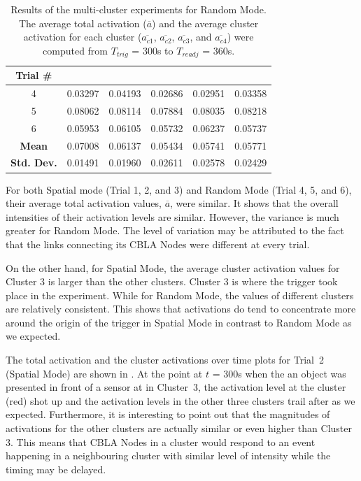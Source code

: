 \begin{table}[!htb]
	\caption[Results of the multi-cluster experiment for Random Mode]{Results of the multi-cluster experiments for Random Mode. The average total activation ($\overline{a}$) and the average cluster activation for each cluster ($\overline{a_{c1}}$, $\overline{a_{c2}}$, $\overline{a_{c3}}$, and $\overline{a_{c4}}$) were computed from $T_{trig}$ = 300s to  $T_{readj}$ = 360s. }
	\begin{center}
		\begin{tabular}{ | c | c | c | c | c | c |} 
			\hline
			\textbf{Trial \#} & \boldmath{$\overline{a}$}  & \boldmath{$\overline{a_{c1}}$}  & \boldmath{$\overline{a_{c2}}$} & \boldmath{$\overline{a_{c3}}$} & \boldmath{$\overline{a_{c4}}$} \\ 
			\hline
			\hline
			4 & 0.03297	& 0.04193 &	0.02686 & 0.02951 & 0.03358 \\
			\hline
			5 &	0.08062 & 0.08114 & 0.07884 & 0.08035 & 0.08218 \\
			\hline
			6 &	0.05953 & 0.06105 &	0.05732 & 0.06237 & 0.05737 \\
			\hlineB{3}	
			\textbf{Mean} & 0.07008	& 0.06137 &	0.05434	& 0.05741 & 0.05771  \\
			\hline
			\textbf{Std. Dev.} & 0.01491 & 0.01960 & 0.02611 & 0.02578 & 0.02429 \\
			\hline	
		\end{tabular}
	\end{center}
	\label{table:multi-cluster-results-random}
\end{table}

For both Spatial mode (Trial 1, 2, and 3) and Random Mode (Trial 4, 5, and 6), their average total activation values, $\overline{a}$, were similar. It shows that the overall intensities of their activation levels are similar. However, the variance is much greater for Random Mode. The level of variation may be attributed to the fact that the links connecting its CBLA Nodes were different at every trial.

On the other hand, for Spatial Mode, the average cluster activation values for Cluster 3 is larger than the other clusters. Cluster 3 is where the trigger took place in the experiment. While for Random Mode, the values of different clusters are relatively consistent. This shows that activations do tend to concentrate more around the origin of the trigger in Spatial Mode in contrast to Random Mode as we expected. 

The total activation and the cluster activations over time plots for Trial~2 (Spatial Mode) are shown in . At the point at $t$ = 300s when the an object was presented in front of a sensor at in Cluster~3, the activation level at the cluster (red) shot up and the activation levels in the other three clusters trail after as we expected. Furthermore, it is interesting to point out that the magnitudes of activations for the other clusters are actually similar or even higher than Cluster 3. This means that CBLA Nodes in a cluster would respond to an event happening in a neighbouring cluster with similar level of intensity while the timing may be delayed.

